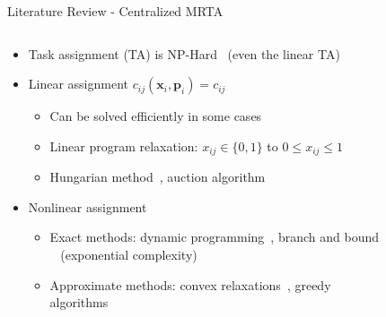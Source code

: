 \begin{frame}{Literature Review - Centralized MRTA}
    \begin{columns}
    \begin{column}{0.65\textwidth}
    \begin{itemize}
        \item Task assignment (TA) is NP-Hard~\cite{karp2010reducibility} (even the linear TA)
        \item Linear assignment $c_{ij}(\mathbf{x}_i,{\mathbf{p}_i}) = c_{ij}$ 
        \begin{itemize}
            \item Can be solved efficiently in some cases~\cite{bertsekas1991linear}
            \item Linear program relaxation: $x_{ij} \in \{0, 1\}$ to $0\le x_{ij} \le 1$
            \item Hungarian method~\cite{kuhn1955hungarian}, auction algorithm~\cite{bertsekas1988auction}
        \end{itemize}
        \vspace{0.4cm}
        \pause
        \item Nonlinear assignment
        \begin{itemize}
            \item Exact methods: dynamic programming~\cite{pardalos1999nonlinear}, branch and bound ~\cite{dyer1986linear} (exponential complexity)
            \item Approximate methods: convex relaxations~\cite{ma2015efficient}, greedy algorithms~\cite{romeijn2000class}
        \end{itemize}
    \end{itemize}
    \end{column}
    \begin{column}{0.5\textwidth}
    \begin{figure}
        \centering

\end{figure}
\end{column}
\end{columns}
\end{frame}

